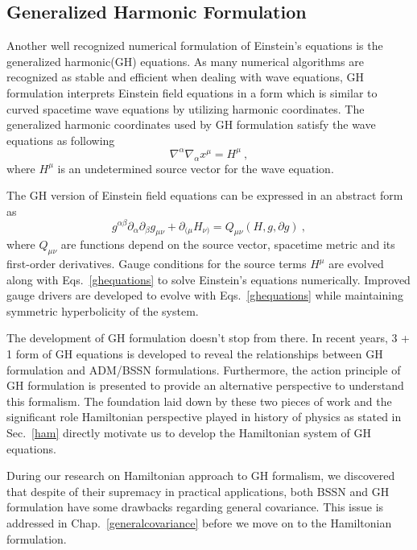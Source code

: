 \subsection{Generalized Harmonic Formulation}
Another well recognized numerical formulation of Einstein's equations is the generalized harmonic(GH) equations\cite{Friedrich:1985, Garfinkle:2001ni, Pretorius:2006tp}. As many numerical algorithms are recognized as stable and efficient when dealing with wave equations, GH formulation interprets Einstein field equations in a form which is similar to curved spacetime wave equations by utilizing harmonic coordinates. The generalized harmonic coordinates used by GH formulation satisfy the wave equations as following
\begin{equation}
	\nabla^{\alpha}\nabla_{\alpha}x^{\mu} = H^{\mu} \ ,
\end{equation}
where $H^{\mu}$ is an undetermined source vector for the wave equation\cite{Friedrich:1985, Friedrich:1996, Garfinkle:2001ni}. 

The GH version of Einstein field equations can be expressed in an abstract form as
\begin{equation}\label{ghequations}
	g^{\alpha\beta}\partial_{\alpha}\partial_{\beta}g_{\mu\nu} + \partial_{(\mu}H_{\nu)} = Q_{\mu\nu}(H, g, \partial g) \ , 
\end{equation}
where $Q_{\mu\nu}$ are functions depend on the source vector, spacetime metric and its first-order derivatives. Gauge conditions for the source terms $H^{\mu}$ are evolved along with Eqs.~\ref{ghequations} to solve Einstein's equations numerically. Improved gauge drivers\cite{Lindblom:2007xw, Lindblom:2009tu} are developed to evolve with Eqs.~\ref{ghequations} while maintaining symmetric hyperbolicity of the system\cite{Lindblom:2005qh, }. 

The development of GH formulation doesn't stop from there. In recent years, 3 + 1 form of GH equations\cite{Brown:2011qg} is developed
to reveal the relationships between GH formulation and ADM/BSSN formulations. Furthermore, the action principle of GH formulation\cite{Brown:2010rya} is presented to provide an alternative perspective to understand this formalism. The foundation laid down by these two pieces of work and the significant role Hamiltonian perspective played in history of physics as stated in Sec.~\ref{ham} directly motivate us to develop the Hamiltonian system of GH equations. 

During our research on Hamiltonian approach to GH formalism, we discovered that despite of their supremacy in practical applications, both BSSN and GH formulation have some drawbacks regarding general covariance. This issue is addressed in Chap.~\ref{generalcovariance} before we move on to the Hamiltonian formulation. 

